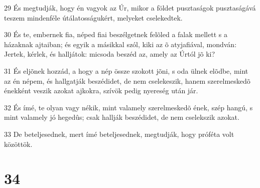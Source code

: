 \par 29 És megtudják, hogy én vagyok az Úr, mikor a földet pusztaságok pusztaságává teszem mindenféle útálatosságukért, melyeket cselekedtek.
\par 30 És te, embernek fia, néped fiai beszélgetnek felõled a falak mellett s a házaknak ajtaiban; és egyik a másikkal szól, kiki az õ atyjafiával, mondván: Jertek, kérlek, és halljátok: micsoda beszéd az, amely az Úrtól jõ ki?
\par 31 És eljõnek hozzád, a hogy a nép össze szokott jõni, s oda ülnek elõdbe, mint az én népem, és hallgatják beszédidet, de nem cselekeszik, hanem szerelmeskedõ énekként veszik azokat ajkokra,  szívök pedig nyereség után jár.
\par 32 És ímé, te olyan vagy nékik, mint valamely szerelmeskedõ ének, szép hangú, s mint valamely jó hegedûs; csak hallják beszédidet, de nem cselekszik azokat.
\par 33 De beteljesednek, mert ímé beteljesednek, megtudják, hogy próféta volt közöttök.

\chapter{34}


